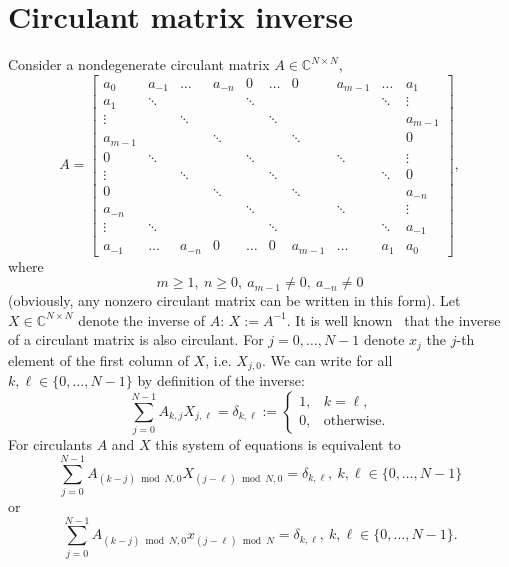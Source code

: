 \documentclass{article}
\begin{document}
	\section{Circulant matrix inverse}
	Consider a nondegenerate circulant matrix $A \in \mathbb{C}^{N\times N}$,
	\begin{equation}\label{eq:A}
	A=
	\begin{bmatrix}
a_0     & a_{-1} & \dots  & a_{-n} & 0      & \dots  & 0       & a_{m-1} & \dots  & a_1     \\
a_1     & \ddots &        &        & \ddots &        &         &         & \ddots & \vdots  \\
\vdots  &        & \ddots &        &        & \ddots &         &         &        & a_{m-1} \\
a_{m-1} &        &        & \ddots &        &        & \ddots  &         &        & 0       \\
0       & \ddots &        &        & \ddots &        &         & \ddots  &        & \vdots  \\
\vdots  &        & \ddots &        &        & \ddots &         &         & \ddots & 0       \\
0       &        &        & \ddots &        &        & \ddots  &         &        & a_{-n}  \\
a_{-n}  &        &        &        & \ddots &        &         & \ddots  &        & \vdots  \\
\vdots  & \ddots &        &        &        & \ddots &         &         & \ddots & a_{-1}  \\
a_{-1}  & \dots  & a_{-n} & 0      & \dots  & 0      & a_{m-1} & \dots   & a_1    & a_0    
	\end{bmatrix},
	\end{equation}
	where 
	\[
	m \ge 1,~n \ge 0,~a_{m-1} \neq 0,~a_{-n} \neq 0
	\]
	(obviously, any nonzero circulant matrix can be written in this form).
	Let $X \in \mathbb{C}^{N \times N}$ denote the inverse of $A$: $X := A^{-1}$.
	It is well known~\cite{somebody} that the inverse of a circulant matrix is also circulant.
	For $j = 0, \dots, N-1$ denote $x_{j}$ the $j$-th element of the first column of $X$, i.e. $X_{j, 0}$.
	We can write for all $k,\ell \in \{0,\dots,N-1\}$ by definition of the inverse:
	\[
	\sum_{j=0}^{N-1} A_{k, j}X_{j,\ell}
	=
	\delta_{k,\ell}
	:=
	\begin{cases}
		1, &k=\ell, \\
		0, &\text{otherwise}.
	\end{cases}
	\]
	For circulants $A$ and $X$ this system of equations is equivalent to 
	\[
	\sum_{j=0}^{N-1} A_{(k-j) \bmod N, 0} X_{(j-\ell)\bmod N, 0}
	=
	\delta_{k,\ell},~k,\ell \in \{0,\dots, N-1\}
	\]
	or 
	\begin{equation}\label{eq:inverse}
	    \sum_{j=0}^{N-1} A_{(k-j) \bmod N, 0} x_{(j-\ell)\bmod N}
	=
	\delta_{k,\ell},
	~k,\ell \in \{0,\dots,N-1\}.
	\end{equation}
	
\end{document}
